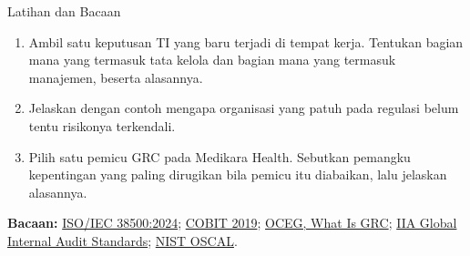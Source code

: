 \documentclass[aspectratio=169, table, 12pt]{beamer}
\begin{document}
\begin{frame}{{\Large Latihan dan Bacaan}}
  \vspace{2pt}
  \footnotesize
  \begin{enumerate}
    \item Ambil satu keputusan TI yang baru terjadi di tempat kerja. Tentukan bagian mana yang
          termasuk tata kelola dan bagian mana yang termasuk manajemen, beserta alasannya.
    \item Jelaskan dengan contoh mengapa organisasi yang patuh pada regulasi belum tentu
          risikonya terkendali.
    \item Pilih satu pemicu GRC pada Medikara Health. Sebutkan pemangku kepentingan yang paling
          dirugikan bila pemicu itu diabaikan, lalu jelaskan alasannya.
  \end{enumerate}
  \vspace{6pt}
  \textbf{Bacaan:} \href{https://www.iso.org/standard/81684.html}{ISO/IEC 38500:2024};
  \href{https://www.isaca.org/resources/cobit}{COBIT 2019};
  \href{https://www.oceg.org/ideas/what-is-grc}{OCEG, What Is GRC};
  \href{https://www.theiia.org/en/standards/2024-standards/global-internal-audit-standards/}{IIA Global Internal Audit Standards};
  \href{https://pages.nist.gov/OSCAL/}{NIST OSCAL}.
\end{frame}
\end{document}
